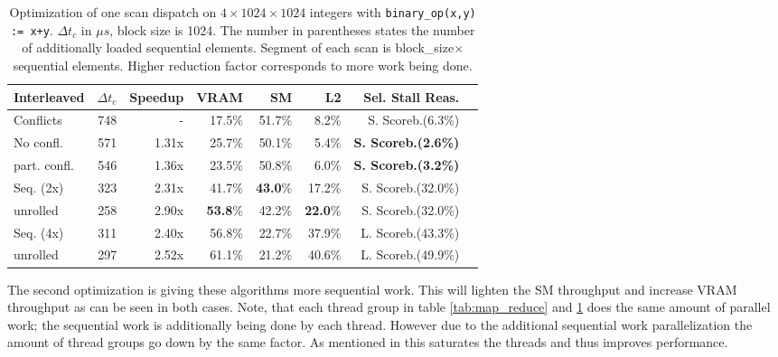 \documentclass[m,times]{cgMA}
\begin{document}
\begin{table}[htpb]
  \begin{tabular}{ | l | r | r | r | r | r | r | r |}    \hline
    Interleaved       &  $\Delta t_c$         & Speedup &VRAM              & SM      & L2     & Sel. Stall Reas.\\\hline
    Conflicts           & 748                   & -       &17.5\%            & 51.7\%  & 8.2\%  & S. Scoreb.(6.3\%)\\\hline
    No confl.           & 571                   & 1.31x   &25.7\%            & 50.1\%  & 5.4\%  & \textbf{S. Scoreb.(2.6\%)}\\\hline
    part. confl.        & 546                   & 1.36x   &23.5\%            & 50.8\%  & 6.0\%  & \textbf{S. Scoreb.(3.2\%)} \\\hline\hline
    Seq. (2x)           & 323                   & 2.31x   &41.7\%            & \textbf{43.0}\%  & 17.2\% & S. Scoreb.(32.0\%)\\\hline
    unrolled            & 258                   & 2.90x   &\textbf{53.8}\%   & 42.2\%  & \textbf{22.0}\% & S. Scoreb.(32.0\%)\\\hline\hline
    Seq. (4x)           & 311                   & 2.40x   &56.8\%            & 22.7\%  & 37.9\% & L. Scoreb.(43.3\%)\\\hline
    unrolled            & 297                   & 2.52x   &61.1\%            & 21.2\%  & 40.6\% & L. Scoreb.(49.9\%)\\
    \hline
  \end{tabular}
  \caption{Optimization of one scan dispatch on $4 \times 1024\times1024$ integers with \texttt{binary\_op(x,y) := x+y}. $\Delta t_c$ in $\mu s$, block size is 1024. The number in parentheses states the number of additionally loaded sequential elements. Segment of each scan is block\_size$\times$ sequential elements. Higher reduction factor corresponds to more work being done.}\label{tab:scan}
\end{table}
The second optimization is giving these algorithms more sequential work. This will lighten the SM throughput and increase VRAM throughput as can be seen in both cases. Note, that each thread group in table \ref{tab:map_reduce} and \ref{tab:scan} does the same amount of parallel work; the sequential work is additionally being done by each thread. However due to the additional sequential work parallelization the amount of thread groups go down by the same factor. As mentioned in \cite{NVIDIA:PARALLEL_REDUCTION} this saturates the threads and thus improves performance.
\end{document}
